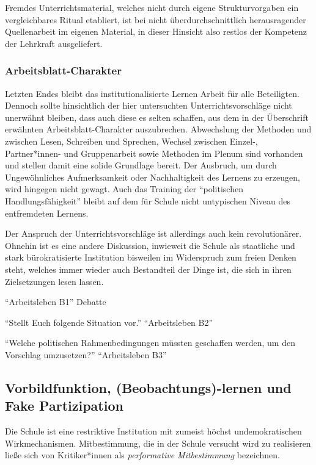 Fremdes Unterrichtsmaterial, welches nicht durch eigene Strukturvorgaben ein vergleichbares Ritual etabliert, ist bei nicht überdurchschnittlich herausragender Quellenarbeit im eigenen Material, in dieser Hinsicht also restlos der Kompetenz der Lehrkraft ausgeliefert. 



\subsubsection{Arbeitsblatt-Charakter}
Letzten Endes bleibt das institutionalisierte Lernen Arbeit für alle Beteiligten. Dennoch sollte hinsichtlich der hier untersuchten Unterrichtsvorschläge nicht unerwähnt bleiben, dass auch diese es selten schaffen, aus dem in der Überschrift erwähnten Arbeitsblatt-Charakter auszubrechen. Abwechslung der Methoden und zwischen Lesen, Schreiben und Sprechen, Wechsel zwischen Einzel-, Partner*innen- und Gruppenarbeit sowie Methoden im Plenum sind vorhanden und stellen damit eine solide Grundlage bereit. Der Ausbruch, um durch Ungewöhnliches Aufmerksamkeit oder Nachhaltigkeit des Lernens zu erzeugen, wird hingegen nicht gewagt. 
Auch das Training der \enquote{politischen Handlungsfähigkeit} bleibt auf dem für Schule nicht untypischen Niveau des entfremdeten Lernens. 

Der Anspruch der Unterrichtsvorschläge ist allerdings auch kein revolutionärer. Ohnehin ist es eine andere Diskussion, inwieweit die Schule als staatliche und stark bürokratisierte Institution bisweilen im Widerspruch zum freien Denken steht, welches immer wieder auch Bestandteil der Dinge ist, die sich in ihren Zielsetzungen lesen lassen. 

\enquote{Arbeitsleben B1} Debatte

\enquote{Stellt Euch folgende Situation vor.} \enquote{Arbeitsleben B2}

\enquote{Welche politischen Rahmenbedingungen müssten geschaffen werden, um den Vorschlag umzusetzen?} \enquote{Arbeitsleben B3}

\subsection{Vorbildfunktion, (Beobachtungs)-lernen und Fake Partizipation \label{fakePartizipation}}
Die Schule ist eine restriktive Institution mit zumeist höchst undemokratischen Wirkmechanismen.
Mitbestimmung, die in der Schule versucht wird zu realisieren ließe sich von Kritiker*innen als \emph{performative Mitbestimmung} bezeichnen. 


